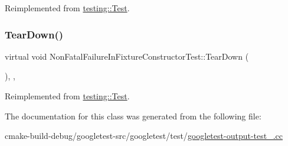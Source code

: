 Reimplemented from \mbox{\hyperlink{classtesting_1_1Test_a190315150c303ddf801313fd1a777733}{testing\+::\+Test}}.

\mbox{\label{classNonFatalFailureInFixtureConstructorTest_ab76d79c346d9a378d625fde5739e8ad6}} 
\subsubsection{\texorpdfstring{TearDown()}{TearDown()}}
{\footnotesize\ttfamily virtual void Non\+Fatal\+Failure\+In\+Fixture\+Constructor\+Test\+::\+Tear\+Down (\begin{DoxyParamCaption}{ }\end{DoxyParamCaption})\hspace{0.3cm}{\ttfamily [inline]}, {\ttfamily [protected]}, {\ttfamily [virtual]}}



Reimplemented from \mbox{\hyperlink{classtesting_1_1Test_a5f0ab439802cbe0ef7552f1a9f791923}{testing\+::\+Test}}.



The documentation for this class was generated from the following file\+:\begin{DoxyCompactItemize}
\item 
cmake-\/build-\/debug/googletest-\/src/googletest/test/\mbox{\hyperlink{googletest-output-test___8cc}{googletest-\/output-\/test\+\_\+.\+cc}}\end{DoxyCompactItemize}
